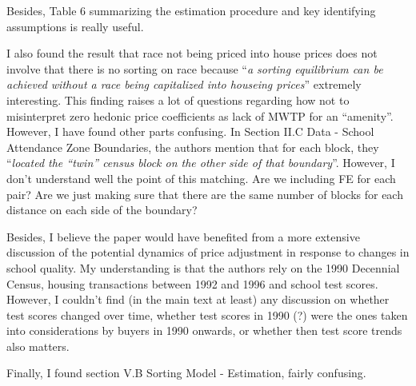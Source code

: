 \documentclass[12pt, final]{article}
\begin{document}
Besides, Table 6 summarizing the estimation procedure and key identifying assumptions is really useful.

I also found the result that race not being priced into house prices does not involve that there is no sorting on race because ``\textit{a sorting equilibrium can be achieved without a race being capitalized into houseing prices}'' extremely interesting. This finding raises a lot of questions regarding how not to misinterpret zero hedonic price coefficients as lack of MWTP for an ``amenity''. 
\\

However, I have found other parts confusing.
In Section II.C Data - School Attendance Zone Boundaries, the authors mention that for each block, they ``\textit{located the ``twin'' census block on the other side of that boundary}''. However, I don't understand well the point of this matching. Are we including FE for each pair? Are we just making sure that there are the same number of blocks for each distance on each side of the boundary?

Besides, I believe the paper would have benefited from a more extensive discussion of the potential dynamics of price adjustment in response to changes in school quality.
My understanding is that the authors rely on the 1990 Decennial Census, housing transactions between 1992 and 1996 and school test scores. However, I couldn't find (in the main text at least) any discussion on whether test scores changed over time, whether test scores in 1990 (?) were the ones taken into considerations by buyers in 1990 onwards, or whether then test score trends also matters. 

Finally, I found section V.B Sorting Model - Estimation, fairly confusing.


\end{document}
